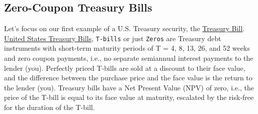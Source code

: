 \documentclass[11pt]{article}
\theoremstyle{definition}
\begin{document}
\subsection{Zero-Coupon Treasury Bills}\label{sec:treasury-bills}
Let's focus on our first example of a U.S. Treasury security, the \href{https://treasurydirect.gov/marketable-securities/treasury-bills/}{Treasury Bill}.
\href{https://treasurydirect.gov/marketable-securities/treasury-bills/}{United States Treasury Bills}, \texttt{T-bills} or just \texttt{Zeros} are Treasury debt instruments with short-term maturity periods 
of T = 4, 8, 13, 26, and 52 weeks and zero coupon payments, i.e., no separate semiannual interest payments to the lender (you).
Perfectly priced T-bills are sold at a discount to their face value, and the difference between the purchase price and the face value is the return to the lender (you).
Treasury bills have a Net Present Value (NPV) of zero, i.e., the price of the T-bill is equal to its face value at maturity, escalated by the risk-free for the duration of the T-bill.
\end{document}
